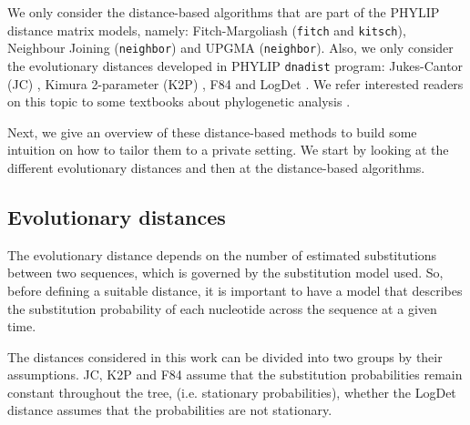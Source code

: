 We only consider the distance-based algorithms that are part of the PHYLIP \cite{F89} distance matrix models, namely: Fitch-Margoliash (\texttt{fitch} and \texttt{kitsch}), Neighbour Joining  (\texttt{neighbor}) and UPGMA (\texttt{neighbor}). Also, we only consider the evolutionary distances developed in PHYLIP \texttt{dnadist} program:  Jukes-Cantor (JC) \cite{JC69}, Kimura 2-parameter (K2P) \cite{K80}, F84 \cite{F84} and LogDet \cite{L94}. We refer interested readers on this topic to some textbooks about phylogenetic analysis \cite{Z06, Felsenstein2003}. %

Next, we give an overview of these distance-based methods to build some intuition on how to tailor them to a private setting. We start by looking at the different evolutionary distances and then at the distance-based algorithms.

\subsection{Evolutionary distances} \label{evolDist}

The evolutionary distance depends on the number of estimated substitutions between two sequences, which is governed by the substitution model used. So, before defining a suitable distance, it is important to have a model that describes the substitution probability of each nucleotide across the sequence at a given time. 

The distances considered in this work can be divided into two groups by their assumptions. JC, K2P and F84 assume that the substitution probabilities remain constant throughout the tree, (i.e. stationary probabilities), whether the LogDet distance assumes that the probabilities are not stationary.  






